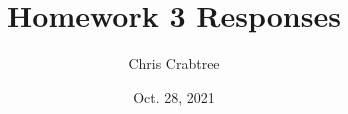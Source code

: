 \documentclass[12pt]{article}
\begin{document}
\title{Homework 3 Responses}
\author{Chris Crabtree}
\date{Oct. 28, 2021}

{
\let\clearpage\relax
\maketitle

}


      













\end{document}
